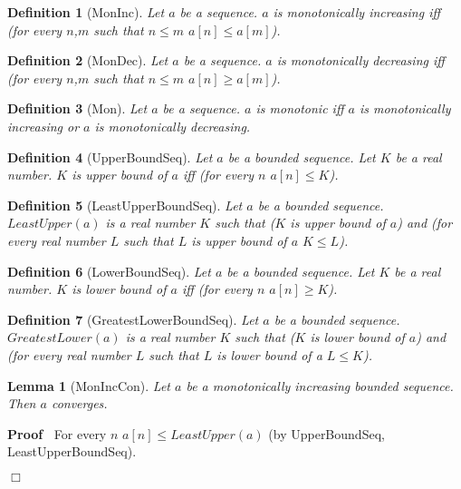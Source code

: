 \documentclass{article}
\newenvironment{forthel}{\begin{leftbar}}{\end{leftbar}}
\newenvironment{proof}{\noindent\textbf{Proof\ }}{\hspace*{\fill}$\Box$\medskip}
\newtheorem{lemma}{Lemma}
\newtheorem{definition}{Definition}
\begin{document}
\begin{forthel}
	
	\begin{definition}[MonInc]
		Let $a$ be a sequence. $a$ is monotonically increasing iff (for every $n$,$m$ such that $n \leq m$ $a[n] \leq a[m]$).
	\end{definition}
	
	\begin{definition}[MonDec]
		Let $a$ be a sequence. $a$ is monotonically decreasing iff (for every $n$,$m$ such that $n \leq m$ $a[n] \geq a[m]$).
	\end{definition}
	
	\begin{definition}[Mon]
		Let $a$ be a sequence. $a$ is monotonic iff $a$ is monotonically increasing or $a$ is monotonically decreasing.
	\end{definition}
	
	\begin{definition}[UpperBoundSeq]
		Let $a$ be a bounded sequence. Let $K$ be a real number. $K$ is upper bound of $a$ iff (for every $n$ $a[n] \leq K$).
	\end{definition}
	
	\begin{definition}[LeastUpperBoundSeq]
		Let $a$ be a bounded sequence. $LeastUpper(a)$ is a real number $K$ such that ($K$ is upper bound of $a$) and 
		(for every real number $L$ such that $L$ is upper bound of $a$ $K \leq L$).
	\end{definition}
	
	\begin{definition}[LowerBoundSeq]
		Let $a$ be a bounded sequence. Let $K$ be a real number. $K$ is lower bound of $a$ iff (for every $n$ $a[n] \geq K$).
	\end{definition}
	
	\begin{definition}[GreatestLowerBoundSeq]
		Let $a$ be a bounded sequence. $GreatestLower(a)$ is a real number $K$ such that ($K$ is lower bound of $a$) and
		(for every real number $L$ such that $L$ is lower bound of a $L \leq K$).
	\end{definition}
	
	\begin{lemma}[MonIncCon]
		Let $a$ be a monotonically increasing bounded sequence. Then $a$ converges.
	\end{lemma}
	
	\begin{proof}
		For every $n$ $a[n] \leq LeastUpper(a)$ (by UpperBoundSeq, LeastUpperBoundSeq).


\end{proof}
\end{forthel}
\end{document}
